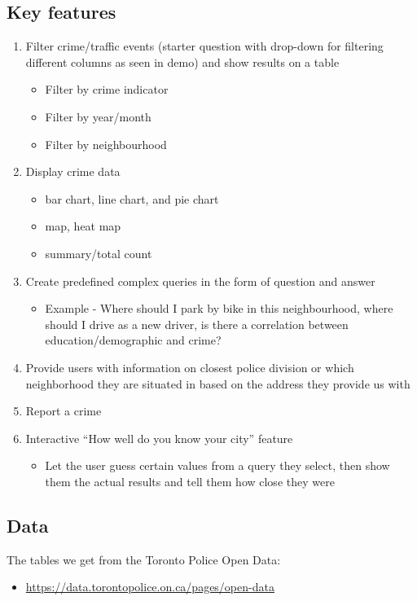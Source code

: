 \documentclass[12pt, a4paper]{article}
\begin{document}
\subsection*{Key features}
\begin{enumerate}
\item Filter crime/traffic events (starter question with drop-down for filtering different columns as seen in demo) and show results on a table
\begin{itemize}
    
    \item Filter by crime indicator
    \item Filter by year/month
    \item Filter by neighbourhood
\end{itemize}
\item Display crime data
\begin{itemize}
\item bar chart, line chart, and pie chart
\item map, heat map

\item summary/total count
\end{itemize}
\item Create predefined complex queries in the form of question and answer
\begin{itemize}
    \item Example - Where should I park by bike in this neighbourhood, where should I drive as a new driver, is there a correlation between education/demographic and crime?
\end{itemize}
\item Provide users with information on closest police division or which neighborhood they are situated in based on the address they provide us with
\item Report a crime
\item Interactive “How well do you know your city” feature
\begin{itemize}
    \item Let the user guess certain values from a query they select, then show them the actual results and tell them how close they were
\end{itemize}
\end{enumerate}
\subsection*{Data}
The tables we get from the Toronto Police Open Data:
\begin{itemize}
    \item \url{https://data.torontopolice.on.ca/pages/open-data}
\end{itemize}
\end{document}
